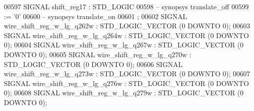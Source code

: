 \begin{DoxyCode}
{00597      \textcolor{keywordflow}{SIGNAL}  \textcolor{vhdlchar}{shift_reg17}    \textcolor{vhdlchar}{:}   \textcolor{comment}{STD\_LOGIC}
00598 \textcolor{keyword}{     -- synopsys translate\_off}
00599       \textcolor{vhdlchar}{:=} \textcolor{vhdlchar}{'}\textcolor{vhdllogic}{}\textcolor{vhdllogic}{0}\textcolor{vhdlchar}{'}
00600 \textcolor{keyword}{     -- synopsys translate\_on}
00601      ;
00602      \textcolor{keywordflow}{SIGNAL}  \textcolor{vhdlchar}{wire_shift_reg_w_lg_q262w}  \textcolor{vhdlchar}{:}   \textcolor{comment}{STD\_LOGIC\_VECTOR} \textcolor{vhdlchar}{(}\textcolor{vhdllogic}{}\textcolor{vhdllogic}{0} \textcolor{keywordflow}{DOWNTO} \textcolor{vhdllogic}{}\textcolor{vhdllogic}{0}\textcolor{vhdlchar}{)};
00603      \textcolor{keywordflow}{SIGNAL}  \textcolor{vhdlchar}{wire_shift_reg_w_lg_q264w}  \textcolor{vhdlchar}{:}   \textcolor{comment}{STD\_LOGIC\_VECTOR} \textcolor{vhdlchar}{(}\textcolor{vhdllogic}{}\textcolor{vhdllogic}{0} \textcolor{keywordflow}{DOWNTO} \textcolor{vhdllogic}{}\textcolor{vhdllogic}{0}\textcolor{vhdlchar}{)};
00604      \textcolor{keywordflow}{SIGNAL}  \textcolor{vhdlchar}{wire_shift_reg_w_lg_q267w}  \textcolor{vhdlchar}{:}   \textcolor{comment}{STD\_LOGIC\_VECTOR} \textcolor{vhdlchar}{(}\textcolor{vhdllogic}{}\textcolor{vhdllogic}{0} \textcolor{keywordflow}{DOWNTO} \textcolor{vhdllogic}{}\textcolor{vhdllogic}{0}\textcolor{vhdlchar}{)};
00605      \textcolor{keywordflow}{SIGNAL}  \textcolor{vhdlchar}{wire_shift_reg_w_lg_q270w}  \textcolor{vhdlchar}{:}   \textcolor{comment}{STD\_LOGIC\_VECTOR} \textcolor{vhdlchar}{(}\textcolor{vhdllogic}{}\textcolor{vhdllogic}{0} \textcolor{keywordflow}{DOWNTO} \textcolor{vhdllogic}{}\textcolor{vhdllogic}{0}\textcolor{vhdlchar}{)};
00606      \textcolor{keywordflow}{SIGNAL}  \textcolor{vhdlchar}{wire_shift_reg_w_lg_q273w}  \textcolor{vhdlchar}{:}   \textcolor{comment}{STD\_LOGIC\_VECTOR} \textcolor{vhdlchar}{(}\textcolor{vhdllogic}{}\textcolor{vhdllogic}{0} \textcolor{keywordflow}{DOWNTO} \textcolor{vhdllogic}{}\textcolor{vhdllogic}{0}\textcolor{vhdlchar}{)};
00607      \textcolor{keywordflow}{SIGNAL}  \textcolor{vhdlchar}{wire_shift_reg_w_lg_q276w}  \textcolor{vhdlchar}{:}   \textcolor{comment}{STD\_LOGIC\_VECTOR} \textcolor{vhdlchar}{(}\textcolor{vhdllogic}{}\textcolor{vhdllogic}{0} \textcolor{keywordflow}{DOWNTO} \textcolor{vhdllogic}{}\textcolor{vhdllogic}{0}\textcolor{vhdlchar}{)};
00608      \textcolor{keywordflow}{SIGNAL}  \textcolor{vhdlchar}{wire_shift_reg_w_lg_q279w}  \textcolor{vhdlchar}{:}   \textcolor{comment}{STD\_LOGIC\_VECTOR} \textcolor{vhdlchar}{(}\textcolor{vhdllogic}{}\textcolor{vhdllogic}{0} \textcolor{keywordflow}{DOWNTO} \textcolor{vhdllogic}{}\textcolor{vhdllogic}{0}\textcolor{vhdlchar}{)};
}
\end{DoxyCode}
